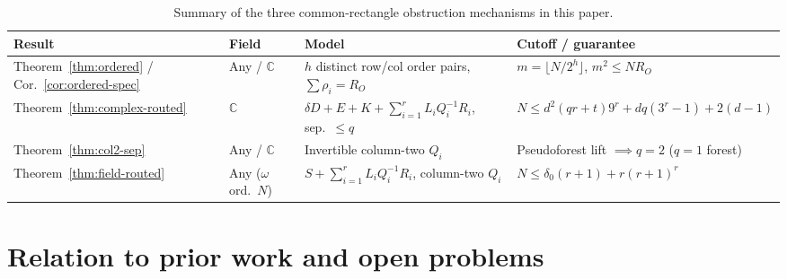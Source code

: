 \documentclass[11pt,reqno]{amsart}
\numberwithin{equation}{section}
\theoremstyle{definition}
\theoremstyle{remark}
\newcommand{\C}{\mathbb{C}}
\begin{document}
\begin{table}[ht]
\centering
\caption{Summary of the three common-rectangle obstruction mechanisms in this paper.}
\label{tab:concordance}
\begin{tabular}{llll}
\toprule
Result & Field & Model & Cutoff / guarantee \\
\midrule
Theorem~\ref{thm:ordered} / Cor.~\ref{cor:ordered-spec} & Any / $\C$ & $h$ distinct row/col order pairs, $\sum\rho_i=R_O$ & $m=\lfloor N/2^h\rfloor$, $m^2\le N R_O$ \\
Theorem~\ref{thm:complex-routed} & $\C$ & $\delta D + E + K + \sum_{i=1}^r L_i Q_i^{-1} R_i$, sep.\ $\le q$ & $N\le d^2(qr+t)9^r + dq(3^r-1)+2(d-1)$ \\
Theorem~\ref{thm:col2-sep} & Any / $\C$ & Invertible column-two $Q_i$ & Pseudoforest lift $\implies q=2$ ($q=1$ forest) \\
Theorem~\ref{thm:field-routed} & Any ($\omega$ ord.\ $N$) & $S + \sum_{i=1}^r L_i Q_i^{-1} R_i$, column-two $Q_i$ & $N \le \delta_0(r+1) + r(r+1)^r$ \\
\bottomrule
\end{tabular}
\end{table}

\section{Relation to prior work and open problems}
\label{sec:prior}
\end{document}
